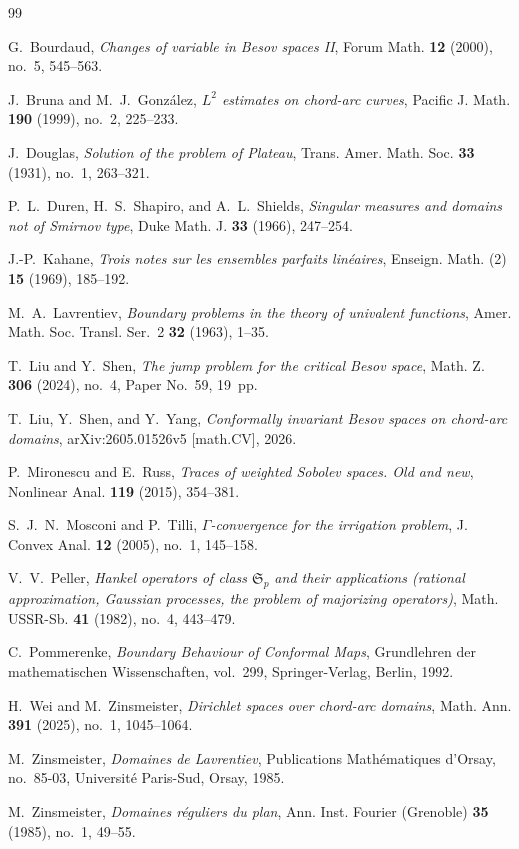 \documentclass[11pt]{article}
\numberwithin{equation}{section}
\theoremstyle{remark}
\begin{document}
\begin{thebibliography}{99}
\setlength{\parskip}{0pt}
\setlength{\parsep}{0pt}
\setlength{\itemsep}{0pt}

G.~Bourdaud,
\emph{Changes of variable in Besov spaces II},
Forum Math. \textbf{12} (2000), no.~5, 545--563.

J.~Bruna and M.~J.~Gonz\'alez,
\emph{$L^2$ estimates on chord-arc curves},
Pacific J. Math. \textbf{190} (1999), no.~2, 225--233.

J.~Douglas,
\emph{Solution of the problem of Plateau},
Trans. Amer. Math. Soc. \textbf{33} (1931), no.~1, 263--321.

P.~L.~Duren, H.~S.~Shapiro, and A.~L.~Shields,
\emph{Singular measures and domains not of Smirnov type},
Duke Math. J. \textbf{33} (1966), 247--254.

J.-P.~Kahane,
\emph{Trois notes sur les ensembles parfaits lin\'eaires},
Enseign. Math. (2) \textbf{15} (1969), 185--192.

M.~A.~Lavrentiev,
\emph{Boundary problems in the theory of univalent functions},
Amer. Math. Soc. Transl. Ser.~2 \textbf{32} (1963), 1--35.

T.~Liu and Y.~Shen,
\emph{The jump problem for the critical Besov space},
Math. Z. \textbf{306} (2024), no.~4, Paper No.~59, 19~pp.

T.~Liu, Y.~Shen, and Y.~Yang,
\emph{Conformally invariant Besov spaces on chord-arc domains},
arXiv:2605.01526v5 [math.CV], 2026.

P.~Mironescu and E.~Russ,
\emph{Traces of weighted Sobolev spaces. Old and new},
Nonlinear Anal. \textbf{119} (2015), 354--381.

S.~J.~N.~Mosconi and P.~Tilli,
\emph{$\Gamma$-convergence for the irrigation problem},
J. Convex Anal. \textbf{12} (2005), no.~1, 145--158.

V.~V.~Peller,
\emph{Hankel operators of class $\mathfrak S_p$ and their applications
(rational approximation, Gaussian processes, the problem of majorizing
operators)},
Math. USSR-Sb. \textbf{41} (1982), no.~4, 443--479.

C.~Pommerenke,
\emph{Boundary Behaviour of Conformal Maps},
Grundlehren der mathematischen Wissenschaften, vol.~299,
Springer-Verlag, Berlin, 1992.

H.~Wei and M.~Zinsmeister,
\emph{Dirichlet spaces over chord-arc domains},
Math. Ann. \textbf{391} (2025), no.~1, 1045--1064.

M.~Zinsmeister,
\emph{Domaines de Lavrentiev},
Publications Math\'ematiques d'Orsay, no.~85-03,
Universit\'e Paris-Sud, Orsay, 1985.

M.~Zinsmeister,
\emph{Domaines r\'eguliers du plan},
Ann. Inst. Fourier (Grenoble) \textbf{35} (1985),
no.~1, 49--55.

\end{thebibliography}
\endgroup
\end{document}

